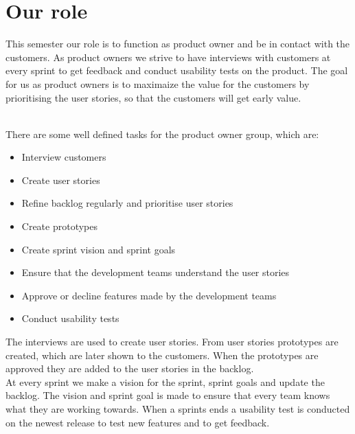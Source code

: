 \section{Our role}
This semester our role is to function as product owner and be in contact with the customers.
As product owners we strive to have interviews with customers at every sprint to get feedback and conduct usability tests on the product. 
The goal for us as product owners is to maximaize the value for the customers by prioritising the user stories, so that the customers will get early value.

\\
There are some well defined tasks for the product owner group, which are:
\begin{itemize}
    \item Interview customers
    \item Create user stories    
    \item Refine backlog regularly and prioritise user stories
    \item Create prototypes
    \item Create sprint vision and sprint goals
    \item Ensure that the development teams understand the user stories
    \item Approve or decline features made by the development teams
    \item Conduct usability tests
\end{itemize}
\noindent
The interviews are used to create user stories. 
From user stories prototypes are created, which are later shown to the customers.
When the prototypes are approved they are added to the user stories in the backlog.
\\
At every sprint we make a vision for the sprint, sprint goals and update the backlog. 
The vision and sprint goal is made to ensure that every team knows what they are working towards.
When a sprints ends a usability test is conducted on the newest release to test new features and to get feedback.
